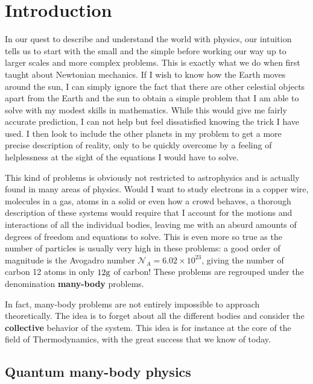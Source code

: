 \chapter*{Introduction}

\label{chap:intro}

In our quest to describe and understand the world with physics, our intuition tells us to start with the small and the simple before working our way up to larger scales and more complex problems. This is exactly what we do when first taught about Newtonian mechanics. If I wish to know how the Earth moves around the sun, I can simply ignore the fact that there are other celestial objects apart from the Earth and the sun to obtain a simple problem that I am able to solve with my modest skills in mathematics. While this would give me fairly accurate prediction, I can not help but feel dissatisfied knowing the trick I have used. I then look to include the other planets in my problem to get a more precise description of reality, only to be quickly overcome by a feeling of helplessness at the sight of the equations I would have to solve.

This kind of problems is obviously not restricted to astrophysics and is actually found in many areas of physics. Would I want to study electrons in a copper wire, molecules in a gas, atoms in a solid or even how a crowd behaves, a thorough description of these systems would require that I account for the motions and interactions of all the individual bodies, leaving me with an absurd amounts of degrees of freedom and equations to solve. This is even more so true as the number of particles is usually very high in these problems: a good order of magnitude is the Avogadro number $\mathcal{N}_A = 6.02 \times 10^{23}$, giving the number of carbon 12 atoms in only $12\rm{g}$ of carbon! These problems are regrouped under the denomination \textbf{many-body} problems. 

In fact, many-body problems are not entirely impossible to approach theoretically. The idea is to forget about all the different bodies and consider the \textbf{collective} behavior of the system. This idea is for instance at the core of the field of Thermodynamics, with the great success that we know of today. 


\section*{Quantum many-body physics}

